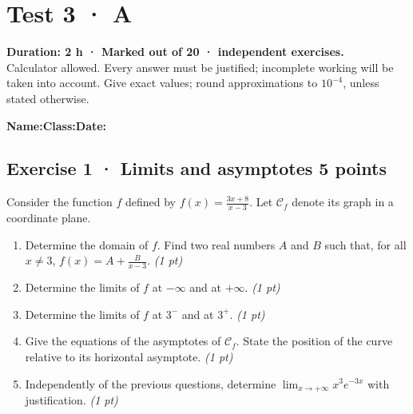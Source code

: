 \fi

\ifmxteacher

\mxnewpage{}\label{sujet:4-3}

\section*{Test 3 · A}


\textbf{Duration: 2 h · Marked out of 20 ·  independent exercises.}\\Calculator allowed. Every answer must be justified; incomplete working will be taken into account. Give exact values; round approximations to $10^{-4}$, unless stated otherwise.

\smallskip\textbf{Name:}\enspace\dotfill\quad\textbf{Class:}\enspace\dotfill\quad\textbf{Date:}\enspace\dotfill

\subsection*{Exercise 1 · Limits and asymptotes \hfill 5 points}Consider the function $f$ defined by $f(x)=\frac{3x+8}{x-3}$. Let $\mathcal C_f$ denote its graph in a coordinate plane.

\begin{enumerate}

\item Determine the domain of $f$. Find two real numbers $A$ and $B$ such that, for all $x\ne3$, $f(x)=A+\frac B{x-3}$. \hfill\textit{(1 pt)}

\item Determine the limits of $f$ at $-\infty$ and at $+\infty$. \hfill\textit{(1 pt)}

\item Determine the limits of $f$ at $3^-$ and at $3^+$. \hfill\textit{(1 pt)}

\item Give the equations of the asymptotes of $\mathcal C_f$. State the position of the curve relative to its horizontal asymptote. \hfill\textit{(1 pt)}

\item Independently of the previous questions, determine $\displaystyle\lim_{x\to+\infty}x^{3}e^{-3x}$ with justification. \hfill\textit{(1 pt)}

\end{enumerate}

